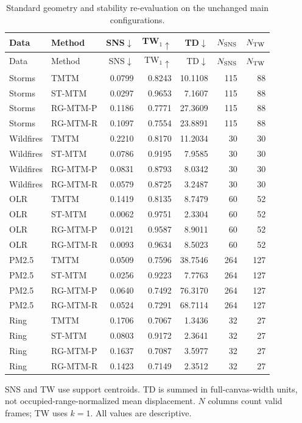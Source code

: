 \begingroup\small\setlength{\tabcolsep}{5pt}
\begin{longtable}{llrrrrr}
\caption{Standard geometry and stability re-evaluation on the unchanged main configurations.}\label{tab:standard_geometry}\\\toprule
Data & Method & SNS$\downarrow$ & TW$_1\uparrow$ & TD$\downarrow$ & $N_{\rm SNS}$ & $N_{\rm TW}$\\\midrule\endfirsthead
\toprule Data & Method & SNS$\downarrow$ & TW$_1\uparrow$ & TD$\downarrow$ & $N_{\rm SNS}$ & $N_{\rm TW}$\\\midrule\endhead
\bottomrule\endfoot
Storms & TMTM & 0.0799 & 0.8243 & 10.1108 & 115 & 88\\
Storms & ST-MTM & 0.0297 & 0.9653 & 7.1607 & 115 & 88\\
Storms & RG-MTM-P & 0.1186 & 0.7771 & 27.3609 & 115 & 88\\
Storms & RG-MTM-R & 0.1097 & 0.7554 & 23.8891 & 115 & 88\\
Wildfires & TMTM & 0.2210 & 0.8170 & 11.2034 & 30 & 30\\
Wildfires & ST-MTM & 0.0786 & 0.9195 & 7.9585 & 30 & 30\\
Wildfires & RG-MTM-P & 0.0831 & 0.8793 & 8.0342 & 30 & 30\\
Wildfires & RG-MTM-R & 0.0579 & 0.8725 & 3.2487 & 30 & 30\\
OLR & TMTM & 0.1419 & 0.8135 & 8.7479 & 60 & 52\\
OLR & ST-MTM & 0.0062 & 0.9751 & 2.3304 & 60 & 52\\
OLR & RG-MTM-P & 0.0121 & 0.9587 & 8.9011 & 60 & 52\\
OLR & RG-MTM-R & 0.0093 & 0.9634 & 8.5023 & 60 & 52\\
PM2.5 & TMTM & 0.0509 & 0.7596 & 38.7546 & 264 & 127\\
PM2.5 & ST-MTM & 0.0256 & 0.9223 & 7.7763 & 264 & 127\\
PM2.5 & RG-MTM-P & 0.0640 & 0.7492 & 76.3170 & 264 & 127\\
PM2.5 & RG-MTM-R & 0.0524 & 0.7291 & 68.7114 & 264 & 127\\
Ring & TMTM & 0.1706 & 0.7067 & 1.3436 & 32 & 27\\
Ring & ST-MTM & 0.0803 & 0.9172 & 2.3641 & 32 & 27\\
Ring & RG-MTM-P & 0.1637 & 0.7087 & 3.5977 & 32 & 27\\
Ring & RG-MTM-R & 0.1423 & 0.7149 & 2.3512 & 32 & 27\\
\end{longtable}
\noindent SNS and TW use support centroids. TD is summed in full-canvas-width units, not occupied-range-normalized mean displacement. $N$ columns count valid frames; TW uses $k=1$. All values are descriptive.\endgroup
